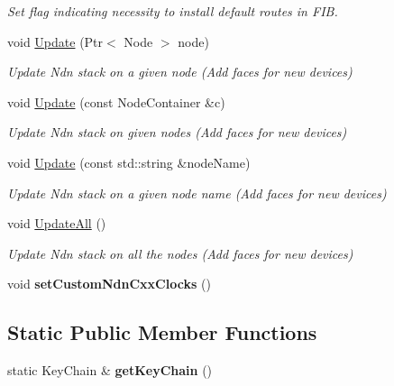 \begin{DoxyCompactItemize}
\begin{DoxyCompactList}\small\item\em Set flag indicating necessity to install default routes in F\+IB. \end{DoxyCompactList}\item 
void \hyperlink{classns3_1_1ndn_1_1StackHelper_ac17e4f6451b89425ccabc6ed702f8d99}{Update} (Ptr$<$ Node $>$ node)
\begin{DoxyCompactList}\small\item\em Update Ndn stack on a given node (Add faces for new devices) \end{DoxyCompactList}\item 
void \hyperlink{classns3_1_1ndn_1_1StackHelper_a3cc49b539411921d6ebfa668999db481}{Update} (const Node\+Container \&c)
\begin{DoxyCompactList}\small\item\em Update Ndn stack on given nodes (Add faces for new devices) \end{DoxyCompactList}\item 
void \hyperlink{classns3_1_1ndn_1_1StackHelper_a969bb39ed1a9e11e95885df3ab4bc73d}{Update} (const std\+::string \&node\+Name)
\begin{DoxyCompactList}\small\item\em Update Ndn stack on a given node name (Add faces for new devices) \end{DoxyCompactList}\item 
void \hyperlink{classns3_1_1ndn_1_1StackHelper_a808f6a0ba9784c313b121a9836ae0cd7}{Update\+All} ()\hypertarget{classns3_1_1ndn_1_1StackHelper_a808f6a0ba9784c313b121a9836ae0cd7}{}\label{classns3_1_1ndn_1_1StackHelper_a808f6a0ba9784c313b121a9836ae0cd7}

\begin{DoxyCompactList}\small\item\em Update Ndn stack on all the nodes (Add faces for new devices) \end{DoxyCompactList}\item 
void {\bfseries set\+Custom\+Ndn\+Cxx\+Clocks} ()\hypertarget{classns3_1_1ndn_1_1StackHelper_a0f5f94e6f7eb2cdaff5621d57a4cd32f}{}\label{classns3_1_1ndn_1_1StackHelper_a0f5f94e6f7eb2cdaff5621d57a4cd32f}

\end{DoxyCompactItemize}
\subsection*{Static Public Member Functions}
\begin{DoxyCompactItemize}
\item 
static Key\+Chain \& {\bfseries get\+Key\+Chain} ()\hypertarget{classns3_1_1ndn_1_1StackHelper_a435964babf79fb356a9fb1e47cb190fe}{}\label{classns3_1_1ndn_1_1StackHelper_a435964babf79fb356a9fb1e47cb190fe}

\end{DoxyCompactItemize}


